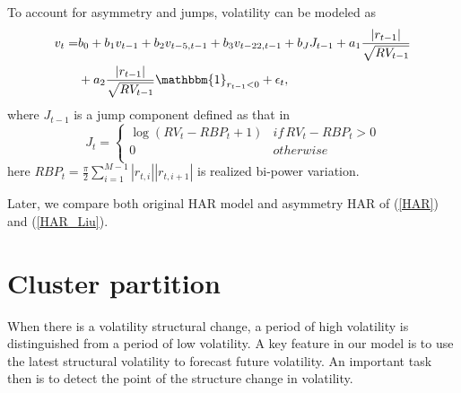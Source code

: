 \documentclass[preprint,12pt,authoryear]{elsarticle}
\begin{document}
To account for asymmetry and jumps, volatility can be modeled as
\begin{align}\label{HAR_Liu}
	v_t=&b_0+b_1v_{t-1}+b_2v_{t-5,t-1}+b_3v_{t-22,t-1}+b_JJ_{t-1}+a_{1}\frac{|r_{t-1}|}{\sqrt{RV_{t-1}}}\notag\\
	&+a_{2}\frac{|r_{t-1}|}{\sqrt{RV_{t-1}}}\mathbbm{1}_{r_{t-1}<0} +\epsilon_t,
\end{align}
where $J_{t-1}$ is a jump component defined as that in \cite{Liu2008}
\begin{equation*}
	J_t=\left\{
	\begin{matrix}
		\log(RV_t-RBP_t+1) & if \, RV_t-RBP_t>0 \\
		0 & otherwise \\
	\end{matrix}
	\right.
\end{equation*}
here $RBP_t=\frac\pi2\sum_{i=1}^{M-1}|r_{t,i}||r_{t,i+1}|$ is realized bi-power variation.

Later, we compare both original HAR model and asymmetry HAR of (\ref{HAR}) and (\ref{HAR_Liu}).

\section{Cluster partition}

When there is a volatility structural change, a period of high volatility is distinguished from a period of low volatility. A key feature in our model is to use the latest structural volatility to forecast future volatility. An important task then is to detect the point of the structure change in volatility.
\end{document}
